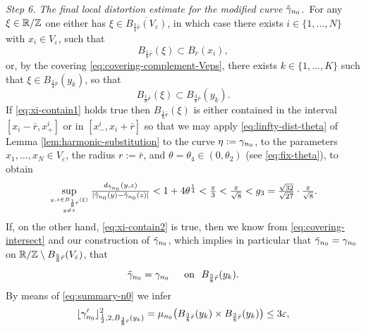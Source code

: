 {\it Step 6. The final local distortion estimate for
the modified curve $\tilde{\gamma}_{n_0}$.}\,
For any $\xi\in\mathbb{R}/\mathbb{Z}$ one either has $\xi\in\overline{B_{\frac34 \bar{r}}(
V_\varepsilon)}$, in which case there exists $i\in\{1,\ldots,N\}$ 
with $x_i\in V_\varepsilon$, such that
\begin{equation}\label{eq:xi-contain1}
B_{\frac18\bar{r}}(\xi)\subset 
B_{\bar{r}}(x_i),
\end{equation}
or, by the covering \eqref{eq:covering-complement-Veps}, there exists
$k\in\{1,\ldots,K\}$ such that $\xi\in B_{\frac14 \bar{r}}(y_k)$, so that
\begin{equation}\label{eq:xi-contain2}
B_{\frac18\bar{r}}(\xi)\subset B_{\frac38 \bar{r}}(y_k).
\end{equation}
If \eqref{eq:xi-contain1} holds true then $B_{\frac18\bar{r}}(\xi)$
is either contained in the interval $[x_i-\bar{r},x_+^i]$ or in
$[x_-^i,x_i+\bar{r}]$ so that we may apply \eqref{eq:linfty-dist-theta}
of Lemma \ref{lem:harmonic-substitution} to the curve $\eta:=
\gamma_{n_0}$, to the parameters $x_1,\ldots,x_N\in V_\varepsilon$,
the radius $r:=\bar{r}$, and $\theta=\theta_4\in (0,\theta_2)$ (see
\eqref{eq:fix-theta}), to obtain
\begin{equation}\label{eq:distortion-tildegamma1}
\sup_{y,z\in B_{\frac18 \bar{r}}(\xi)\atop y\not= z}\textstyle
\frac{d_{\tilde{\gamma}_{n_0}}(y,z)}{|\tilde{\gamma}_{n_0}(y)-
\tilde{\gamma}_{n_0}(z)|}< 1+4\theta^\frac14<\frac{\pi}3<\frac{\pi}{\sqrt{8}}
<g_3=\frac{\sqrt{32}}{\sqrt{27}}\cdot
\frac{\pi}{\sqrt{8}}.
\end{equation}
If, on the other hand, \eqref{eq:xi-contain2} is true, then we know
from \eqref{eq:covering-intersect} and our construction of 
$\tilde{\gamma}_{n_0}$,  which implies in particular that $\tilde{\gamma}_{n_0}=
\gamma_{n_0}$ on $\mathbb{R}/\mathbb{Z}\setminus B_{\frac58 \bar{r}}(V_\varepsilon)$,
that
\begin{equation}\label{eq:coincidence-gamma-tildegamma}
\tilde{\gamma}_{n_0}=\gamma_{n_0}\quad\,\,\,\text{on }\,\, B_{\frac38 \bar{r}}(y_k).
\end{equation}
By means of \eqref{eq:summary-n0} we infer
\begin{equation}\label{eq:small-mu-n0-measure}
\lfloor\gamma_{n_0}'\rfloor^2_{\frac12,2,B_{\frac38 \bar{r}}(y_k)}=
\mu_{n_0}\big(B_{\frac38 \bar{r}}(y_k)\times B_{\frac38 \bar{r}}(y_k)\big)
\le 3\varepsilon,
\end{equation}
